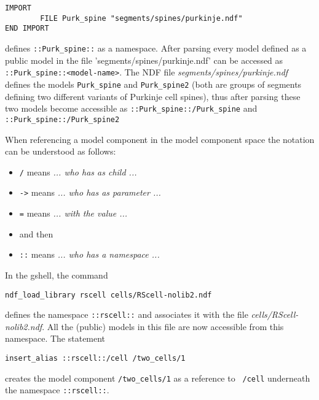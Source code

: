 \documentclass[12pt]{article}
\begin{document}
\begin{verbatim}
IMPORT
        FILE Purk_spine "segments/spines/purkinje.ndf"
END IMPORT
\end{verbatim}

defines {\tt ::Purk\_spine::} as a namespace.  After parsing every
model defined as a public model in the file
'segments/spines/purkinje.ndf' can be accessed as {\tt
  ::Purk\_spine::<model-name>}.  The NDF file {\it
  segments/spines/purkinje.ndf} defines the models {\tt Purk\_spine}
and {\tt Purk\_spine2} (both are groups of segments defining two
different variants of Purkinje cell spines), thus after parsing these
two models become accessible as {\tt ::Purk\_spine::/Purk\_spine} and
{\tt ::Purk\_spine::/Purk\_spine2}

When referencing a model component in the model component space the
notation can be understood as follows:

\begin{itemize}
\item[] {\tt /} means {\it ... who has as child ...}
\item[] {\tt ->} means {\it ... who has as parameter ...}
\item[] {\tt =} means {\it ... with the value ...}

\item[]  and then

\item[] {\tt ::} means {\it ... who has a namespace ...}
\end{itemize}

In the gshell, the command

\begin{verbatim}
ndf_load_library rscell cells/RScell-nolib2.ndf
\end{verbatim}

defines the namespace {\tt ::rscell::} and associates it with the file
{\it cells/RScell-nolib2.ndf}.  All the (public) models in this file
are now accessible from this namespace.  The statement

\begin{verbatim}
insert_alias ::rscell::/cell /two_cells/1
\end{verbatim}

creates the model component {\tt /two\_cells/1} as a reference to {\tt
  /cell} underneath the namespace {\tt ::rscell::}.
\end{document}
